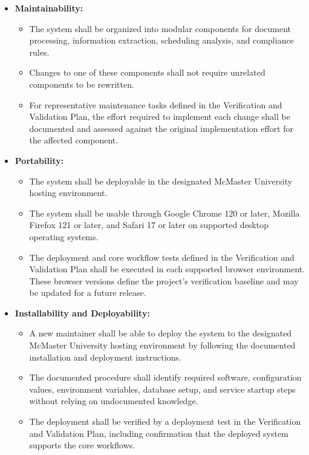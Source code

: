\documentclass[12pt]{article}
\newcounter{nfrnum} %
\begin{document}
\begin{itemize}
\item[NFR\refstepcounter{nfrnum}\thenfrnum \label{NFR_Maintainability}:]
\textbf{Maintainability:}
\begin{itemize}
    \item The system shall be organized into modular components for document processing,
    information extraction, scheduling analysis, and compliance rules.
    \item Changes to one of these components shall not require unrelated components to be
    rewritten.
    \item For representative maintenance tasks defined in the Verification and Validation
    Plan, the effort required to implement each change shall be documented and assessed
    against the original implementation effort for the affected component.
\end{itemize}

\item[NFR\refstepcounter{nfrnum}\thenfrnum \label{NFR_Portability}:]
\textbf{Portability:}
\begin{itemize}
    \item The system shall be deployable in the designated McMaster University hosting
    environment.
    \item The system shall be usable through Google Chrome 120 or later, Mozilla Firefox 121
    or later, and Safari 17 or later on supported desktop operating systems.
    \item The deployment and core workflow tests defined in the Verification and Validation
    Plan shall be executed in each supported browser environment. These browser versions
    define the project's verification baseline and may be updated for a future release.
\end{itemize}

\item[NFR\refstepcounter{nfrnum}\thenfrnum \label{NFR_Installability}:]
\textbf{Installability and Deployability:}
\begin{itemize}
    \item A new maintainer shall be able to deploy the system to the designated McMaster
    University hosting environment by following the documented installation and deployment
    instructions.
    \item The documented procedure shall identify required software, configuration values,
    environment variables, database setup, and service startup steps without relying on
    undocumented knowledge.
    \item The deployment shall be verified by a deployment test in the Verification and
    Validation Plan, including confirmation that the deployed system supports the core
    workflows.
\end{itemize}


\end{itemize}
\end{document}
